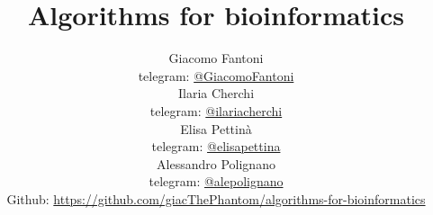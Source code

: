 

\title{\Huge\textbf{{Algorithms for bioinformatics}}}

\author{
  Giacomo Fantoni \\
  \small telegram: \href{https://t.me/GiacomoFantoni}{@GiacomoFantoni} \\[3pt]
  Ilaria Cherchi \\
  \small telegram: \href{https://t.me/ilariacherchi}{@ilariacherchi} \\[3pt]
  Elisa Pettin\`a \\
  \small telegram: \href{https://t.me/elisapettina}{@elisapettina} \\[3pt]
  Alessandro Polignano \\
  \small telegram: \href{https://t.me/alepolignano}{@alepolignano} \\[3pt]
\small Github: \href{https://github.com/giacThePhantom/algorithms-for-bioinformatics}{https://github.com/giacThePhantom/algorithms-for-bioinformatics}
}


\maketitle
\tableofcontents

















